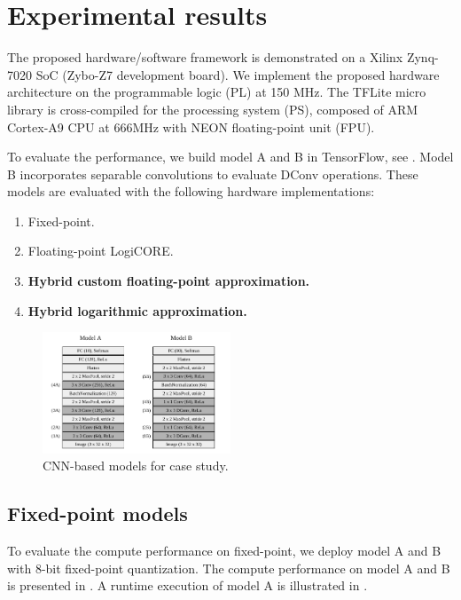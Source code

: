 \section{Experimental results}
\label{sec:experimental_results}
The proposed hardware/software framework is demonstrated on a Xilinx Zynq-7020 SoC (Zybo-Z7 development board). We implement the proposed hardware architecture on the programmable logic (PL) at 150 MHz. The TFLite micro library is cross-compiled for the processing system (PS), composed of ARM Cortex-A9 CPU at 666MHz with NEON floating-point unit (FPU)\cite{xilinx2015zynq}.

To evaluate the performance, we build model A and B in TensorFlow, see . Model B incorporates separable convolutions to evaluate DConv operations. These models are evaluated with the following hardware implementations:

\begin{enumerate}
	\item Fixed-point.
	\item Floating-point LogiCORE.
	\item \textbf{Hybrid custom floating-point approximation.}
	\item \textbf{Hybrid logarithmic approximation.}
\end{enumerate}


\begin{figure}[t!]
	\centering
	\includegraphics[width=0.5\textwidth]{../figures/models.pdf}
	\caption{CNN-based models for case study.}
	\label{fig:models}
\end{figure}

\subsection{Fixed-point models}
To evaluate the compute performance on fixed-point, we deploy model A and B with 8-bit fixed-point quantization. The compute performance on model A and B is presented in . A runtime execution of model A is illustrated in .

